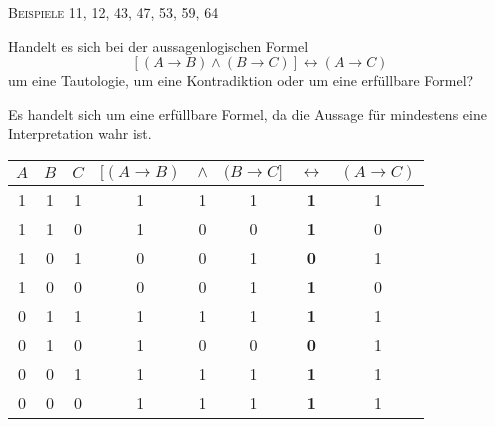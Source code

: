 \documentclass[a4paper, margins=2.5cm]{homework}
\begin{document}
	\begin{center}
    \textsc{Beispiele 11, 12, 43, 47, 53, 59, 64}
  \end{center}

\begin{problem}
	Handelt es sich bei der aussagenlogischen Formel
	\[ [(A \rightarrow B) \wedge (B \rightarrow C)] \leftrightarrow (A \rightarrow C) \]
	um eine Tautologie, um eine Kontradiktion oder um eine erfüllbare Formel?
\end{problem}
\begin{solution}
	Es handelt sich um eine erfüllbare Formel, da die Aussage für mindestens
	eine Interpretation wahr ist. \\

	\begin{center}
		\begin{tabular}{|ccc|c|c|c|c|c|}
			\hline
			$A$ & $B$ & $C$ & $[(A \rightarrow B)$ & $\wedge$ & $(B \rightarrow C]$ & $\leftrightarrow$ & $(A \rightarrow C)$ \\ \hline
			1   & 1   & 1   & 1                    & 1        & 1                   & \textbf{1}        & 1                   \\ \hline
			1   & 1   & 0   & 1                    & 0        & 0                   & \textbf{1}        & 0                   \\ \hline
			1   & 0   & 1   & 0                    & 0        & 1                   & \textbf{0}        & 1                   \\ \hline
			1   & 0   & 0   & 0                    & 0        & 1                   & \textbf{1}        & 0                   \\ \hline
			0   & 1   & 1   & 1                    & 1        & 1                   & \textbf{1}        & 1                   \\ \hline
			0   & 1   & 0   & 1                    & 0        & 0                   & \textbf{0}        & 1                   \\ \hline
			0   & 0   & 1   & 1                    & 1        & 1                   & \textbf{1}        & 1                   \\ \hline
			0   & 0   & 0   & 1                    & 1        & 1                   & \textbf{1}        & 1                   \\ \hline
		\end{tabular}
	\end{center}
\end{solution}
\end{document}
